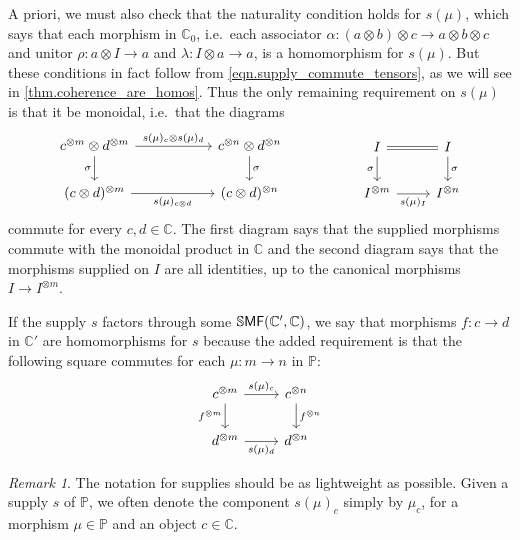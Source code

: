 \documentclass[11pt, oneside, article]{memoir}
\theoremstyle{plain}
\theoremstyle{definition}
\theoremstyle{remark}
\newtheorem{remark}[theorem]{Remark}
\newcommand{\Cat}[1]{{\mathsf{#1}}}%
\newcommand{\CCat}[1]{\mathbb{\StrLeft{#1}{1}}\Cat{\StrGobbleLeft{#1}{1}}}%
\newcommand{\tpow}[1]{^{\otimes #1}}
\newcommand{\ssmf}{\CCat{SMF}}
\newcommand{\cc}{\mathbb{C}}
\newcommand{\pp}{\mathbb{P}}
\begin{document}
A priori, we must also check that the naturality condition holds for $s(\mu)$, which says that each morphism in $\cc_0$, i.e.\ each associator $\alpha\colon (a\otimes b)\otimes c\to a\otimes b\otimes c$ and unitor $\rho\colon a\otimes I\to a$ and $\lambda\colon I\otimes a\to a$, is a homomorphism for $s(\mu)$. But these conditions in fact follow from \cref{eqn.supply_commute_tensors}, as we will see in \cref{thm.coherence_are_homos}. Thus the only remaining requirement on $s(\mu)$ is that it be monoidal, i.e.\ that the diagrams
\begin{equation}\label{eqn.supply_commute_tensors}
\begin{tikzcd}[column sep=55pt]
	c\tpow{m}\otimes d\tpow{m}\ar[r, "s(\mu)_c\otimes s(\mu)_d"]\ar[d, "\sigma"']&
	c\tpow{n}\otimes d\tpow{n}\ar[d, "\sigma"]\\
	(c\otimes d)\tpow{m}\ar[r, "s(\mu)_{c\otimes d}"']&
	(c\otimes d)\tpow{n}
\end{tikzcd}
\hspace{.7in}
\begin{tikzcd}
	I\ar[r, equal]\ar[d, "\sigma"']&
	I\ar[d, "\sigma"]\\
	I\tpow{m}\ar[r, "s(\mu)_I"']&
	I\tpow{n}
\end{tikzcd}
\end{equation}
 commute for every $c,d\in\cc$. The first diagram says that the supplied morphisms commute with the monoidal product in $\cc$ and the second diagram says that the morphisms supplied on $I$ are all identities, up to the canonical morphisms $I\to I\tpow{m}$. 

If the supply $s$ factors through some $\ssmf(\cc',\cc)$, we say that morphisms $f\colon c\to d$ in $\cc'$ are homomorphisms for $s$ because the added requirement is that the following square commutes for each $\mu\colon m\to n$ in $\pp$:
\begin{equation}\label{eqn.nat_means_homo}
\begin{tikzcd}
	c\tpow{m}\ar[r, "s(\mu)_c"]\ar[d, "f\tpow{m}"']&
	c\tpow{n}\ar[d, "f\tpow{n}"]\\
	d\tpow{m}\ar[r, "s(\mu)_d"']&
	d\tpow{n}
\end{tikzcd}
\end{equation}

\begin{remark}\label{rem.notation_supply}
The notation for supplies should be as lightweight as possible. Given a supply $s$ of $\pp$, we often denote the component $s(\mu)_c$ simply by $\mu_c$, for a morphism $\mu\in\pp$ and an object $c\in\cc$.
\end{remark}
\end{document}
